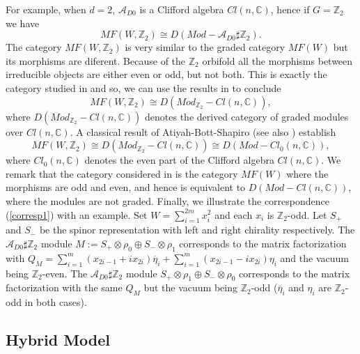 \documentclass[a4paper,11pt]{article}
\def\cA{\mathcal{A}}
\numberwithin{equation}{section}
\begin{document}
For example, when $d=2$, $\cA_{D0}$ is a Clifford algebra $Cl(n,\mathbb{C})$, 
hence if $G=\mathbb{Z}_{2}$ we have
\begin{equation}\label{corresp1}
MF(W,\mathbb{Z}_{2})\cong D(Mod-\cA_{D0} \sharp \mathbb{Z}_2).
\end{equation}
The category $MF(W,\mathbb{Z}_{2})$ is very similar to the graded category 
$MF(W)$ but its morphisms are diferent. Because of the $\mathbb{Z}_{2}$ 
orbifold all the morphisms between irreducible objects are either even or odd, 
but not both. This is exactly the category studied in \cite{Bertin:2008osh} and 
so, we can use the results in \cite{Bertin:2008osh} to conclude
\begin{equation}
MF(W,\mathbb{Z}_{2})\cong D(Mod_{\mathbb{Z}_{2}}-Cl(n,\mathbb{C})),
\end{equation}
where $ D(Mod_{\mathbb{Z}_{2}}-Cl(n,\mathbb{C}))$ denotes the derived category 
of graded modules over $Cl(n,\mathbb{C})$. A classical result of 
Atiyah-Bott-Shapiro \cite{atiyah1964clifford} (see also 
\cite{Bertin:2008osh}) establish
\begin{equation}
MF(W,\mathbb{Z}_{2})\cong D(Mod_{\mathbb{Z}_{2}}-Cl(n,\mathbb{C}))\cong 
D(Mod-Cl_{0}(n,\mathbb{C})),
\end{equation}
where $Cl_{0}(n,\mathbb{C})$ denotes the even part of the Clifford 
algebra $Cl(n,\mathbb{C})$. We remark that the category considered in 
\cite{Kapustin:2002bi} is the category $MF(W)$ where the morphisms are odd and 
even, and hence is equivalent to $D(Mod-Cl(n,\mathbb{C}))$, where the modules 
are not graded. Finally, we illustrate the correspondence (\ref{corresp1}) with 
an example. Set $W = \sum_{i=1}^{2m} x_i^2$ and each $x_i$ is 
$\mathbb{Z}_2$-odd. Let $S_+$ and $S_-$ be the spinor representation with left 
and right chirality respectively. The $\cA_{D0} \sharp \mathbb{Z}_2$ module 
$M:=S_+ \otimes \rho_0 \oplus S_- \otimes \rho_1$ corresponds to the matrix 
factorization with $Q_M = \sum_{i=1}^m(x_{2i-1} + i x_{2i}) \overline{\eta}_i + 
\sum_{i=1}^m(x_{2i-1} - i x_{2i}) \eta_i$ and the vacuum being 
$\mathbb{Z}_2$-even. The $\cA_{D0} \sharp \mathbb{Z}_2$ module $S_+ \otimes 
\rho_1 \oplus S_- \otimes \rho_0$ corresponds to the matrix factorization with 
the same $Q_M$ but the vacuum being $\mathbb{Z}_2$-odd ($\overline{\eta}_i$ and 
$\eta_i$ are $\mathbb{Z}_2$-odd in both cases).

\subsection{Hybrid Model}\label{sec:hybrid}
\end{document}
